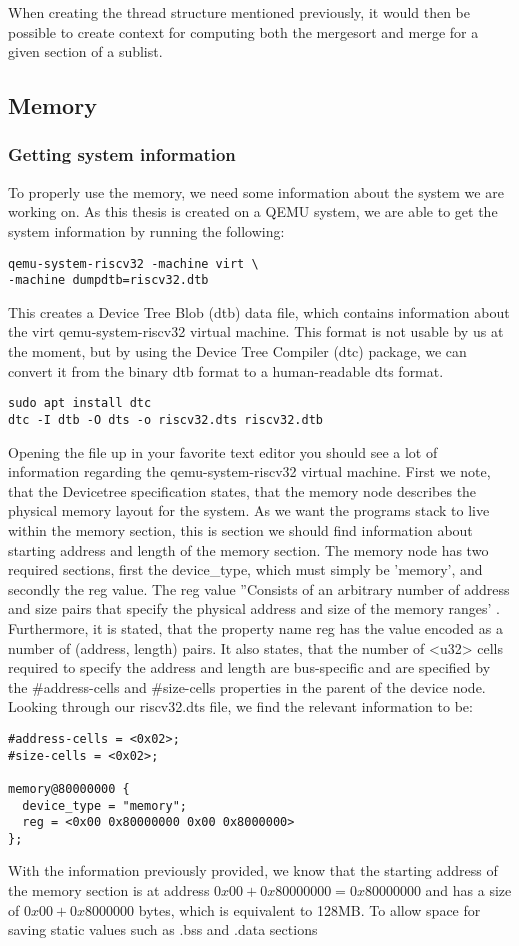 When creating the thread structure mentioned previously, it
would then be possible to create context for computing both the mergesort and
merge for a given section of a sublist.



\subsection{Memory}
\subsubsection*{Getting system information}\label{sec:sys-info}
To properly use the memory, we need some information about the system we are
working on. As this thesis is created on a QEMU system, we are able to get the
system information by running the following:
\begin{lstlisting}
qemu-system-riscv32 -machine virt \
-machine dumpdtb=riscv32.dtb
\end{lstlisting}
 This creates a Device Tree Blob (dtb) data file, which contains information
 about the virt qemu-system-riscv32 virtual machine. This format is not usable
 by us at the moment, but by using the Device Tree Compiler (dtc) package, we
 can convert it from the binary dtb format to a human-readable dts format.
\begin{lstlisting}
sudo apt install dtc
dtc -I dtb -O dts -o riscv32.dts riscv32.dtb
\end{lstlisting}
Opening the file up in your favorite text editor you should see a lot of
information regarding the qemu-system-riscv32 virtual machine. First we note,
that the Devicetree specification states, that the memory node describes the
physical memory layout for the system. As we want the programs stack to live
within the memory section, this is section we should find information about
starting address and length of the memory section. The memory node has two
required sections, first the device\_type, which must simply be 'memory', and
secondly the reg value. The reg value ''Consists of an arbitrary number of
address and size pairs that specify the physical address and size of the memory
ranges' \cite{DTS}. Furthermore, it is stated, that the property name reg has
the value encoded as a number of (address, length) pairs. It also states, that
the number of <u32> cells required to specify the address and length are
bus-specific and are specified by the \#address-cells and \#size-cells
properties in the parent of the device node. Looking through our riscv32.dts
file, we find the relevant information to be:
\begin{lstlisting}
#address-cells = <0x02>;
#size-cells = <0x02>;

memory@80000000 {
  device_type = "memory";
  reg = <0x00 0x80000000 0x00 0x8000000>
};
\end{lstlisting}
With the information previously provided, we know that the starting address of
the memory section is at address $0x00 + 0x80000000 = 0x80000000$ and has a size
of $0x00 + 0x8000000$ bytes, which is equivalent to 128MB. To allow space for
saving static values such as .bss and .data sections


